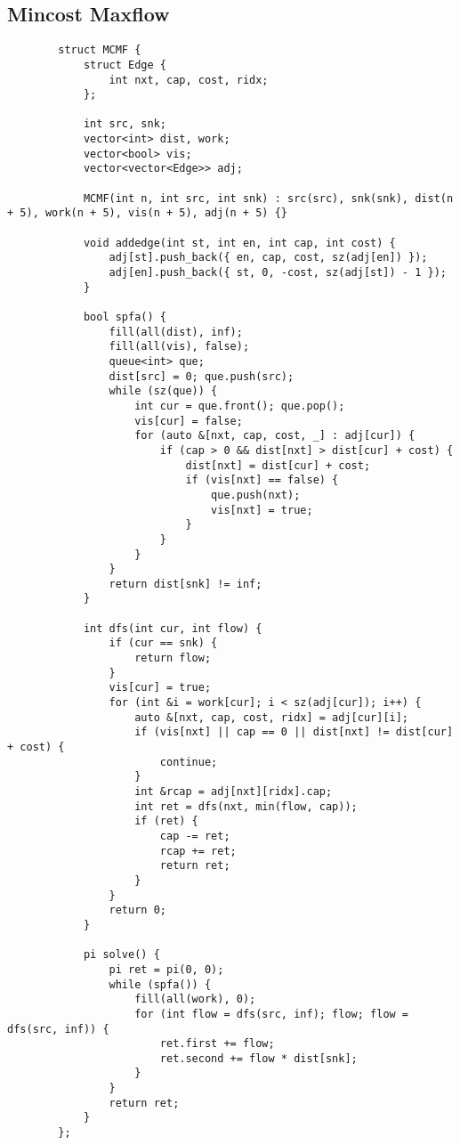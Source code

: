 \documentclass[landscape, 8pt, a4paper, oneside, twocolumn]{extarticle}
\begin{document}
	\subsection {Mincost Maxflow}
	\begin{verbatim}
		struct MCMF {
			struct Edge {
				int nxt, cap, cost, ridx;
			};
			
			int src, snk;
			vector<int> dist, work;
			vector<bool> vis;
			vector<vector<Edge>> adj;
			
			MCMF(int n, int src, int snk) : src(src), snk(snk), dist(n + 5), work(n + 5), vis(n + 5), adj(n + 5) {}
			
			void addedge(int st, int en, int cap, int cost) {
				adj[st].push_back({ en, cap, cost, sz(adj[en]) });
				adj[en].push_back({ st, 0, -cost, sz(adj[st]) - 1 });
			}
			
			bool spfa() {
				fill(all(dist), inf);
				fill(all(vis), false);
				queue<int> que;
				dist[src] = 0; que.push(src);
				while (sz(que)) {
					int cur = que.front(); que.pop();
					vis[cur] = false;
					for (auto &[nxt, cap, cost, _] : adj[cur]) {
						if (cap > 0 && dist[nxt] > dist[cur] + cost) {
							dist[nxt] = dist[cur] + cost;
							if (vis[nxt] == false) {
								que.push(nxt);
								vis[nxt] = true;
							}
						}
					}
				}
				return dist[snk] != inf;
			}
			
			int dfs(int cur, int flow) {
				if (cur == snk) {
					return flow;
				}
				vis[cur] = true;
				for (int &i = work[cur]; i < sz(adj[cur]); i++) {
					auto &[nxt, cap, cost, ridx] = adj[cur][i];
					if (vis[nxt] || cap == 0 || dist[nxt] != dist[cur] + cost) {
						continue;
					}
					int &rcap = adj[nxt][ridx].cap;
					int ret = dfs(nxt, min(flow, cap));
					if (ret) {
						cap -= ret;
						rcap += ret;
						return ret;
					}
				}
				return 0;
			}
			
			pi solve() {
				pi ret = pi(0, 0);
				while (spfa()) {
					fill(all(work), 0);
					for (int flow = dfs(src, inf); flow; flow = dfs(src, inf)) {
						ret.first += flow;
						ret.second += flow * dist[snk];
					}
				}
				return ret;
			}
		};
	\end{verbatim}
\end{document}
